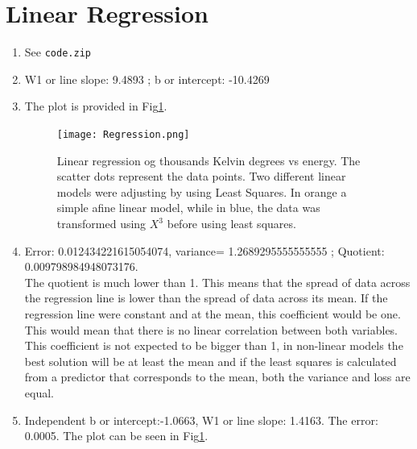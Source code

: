 \documentclass[a4paper]{article}
\begin{document}
\section{Linear Regression}

\begin{enumerate}
  \item See \texttt{code.zip}
  \item W1 or line slope:  9.4893 ;  b or intercept:  -10.4269 
  \item The plot is provided in  Fig\ref{fig:plot_regression}.
    \begin{figure}[H]
      \centering
      \texttt{[image: Regression.png]}
      \caption{Linear regression og thousands Kelvin degrees vs energy. The scatter dots represent the data points. Two different linear models were adjusting by using Least Squares. In orange a simple afine linear model, while in blue, the data was transformed using $X^{3}$ before using least squares.}
      \label{fig:plot_regression}
    \end{figure}
  \item Error: 0.012434221615054074, variance= 1.2689295555555555 ; Quotient: 0.009798984948073176. \\ The quotient is much lower than 1. This means that the spread of data across the regression line is lower than the spread of data across its mean. If the regression line were constant and at the mean, this coefficient would be one. This would mean that there is no linear correlation between both variables. This coefficient is not expected to be bigger than 1, in non-linear models the best solution will be at least the mean and if the least squares is calculated from a predictor that corresponds to the mean, both the variance and loss are equal.
  
 \item Independent b or intercept:-1.0663,  W1 or line slope: 1.4163. The error: 0.0005. The plot can be seen in Fig\ref{fig:plot_regression}.
\end{enumerate}
\end{document}
